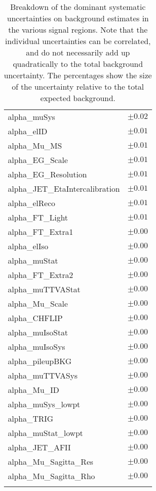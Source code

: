 \begin{table}
\begin{center}
\begin{tabular*}{\textwidth}{@{\extracolsep{\fill}}lc}
alpha\_muSys         & $\pm 0.02$       \\
alpha\_elID         & $\pm 0.01$       \\
alpha\_Mu\_MS         & $\pm 0.01$       \\
alpha\_EG\_Scale         & $\pm 0.01$       \\
alpha\_EG\_Resolution         & $\pm 0.01$       \\
alpha\_JET\_EtaIntercalibration         & $\pm 0.01$       \\
alpha\_elReco         & $\pm 0.01$       \\
alpha\_FT\_Light         & $\pm 0.01$       \\
alpha\_FT\_Extra1         & $\pm 0.00$       \\
alpha\_elIso         & $\pm 0.00$       \\
alpha\_muStat         & $\pm 0.00$       \\
alpha\_FT\_Extra2         & $\pm 0.00$       \\
alpha\_muTTVAStat         & $\pm 0.00$       \\
alpha\_Mu\_Scale         & $\pm 0.00$       \\
alpha\_CHFLIP         & $\pm 0.00$       \\
alpha\_muIsoStat         & $\pm 0.00$       \\
alpha\_muIsoSys         & $\pm 0.00$       \\
alpha\_pileupBKG         & $\pm 0.00$       \\
alpha\_muTTVASys         & $\pm 0.00$       \\
alpha\_Mu\_ID         & $\pm 0.00$       \\
alpha\_muSys\_lowpt         & $\pm 0.00$       \\
alpha\_TRIG         & $\pm 0.00$       \\
alpha\_muStat\_lowpt         & $\pm 0.00$       \\
alpha\_JET\_AFII         & $\pm 0.00$       \\
alpha\_Mu\_Sagitta\_Res         & $\pm 0.00$       \\
alpha\_Mu\_Sagitta\_Rho         & $\pm 0.00$       \\
\noalign{\smallskip}\hline\noalign{\smallskip}
\end{tabular*}
\end{center}
\caption[Breakdown of uncertainty on background estimates]{
Breakdown of the dominant systematic uncertainties on background estimates in the various signal regions.
Note that the individual uncertainties can be correlated, and do not necessarily add up quadratically to 
the total background uncertainty. The percentages show the size of the uncertainty relative to the total expected background.
\label{table.results.bkgestimate.uncertainties.Rpc2Lsoft2b}}
\end{table}
\clearpage
%
